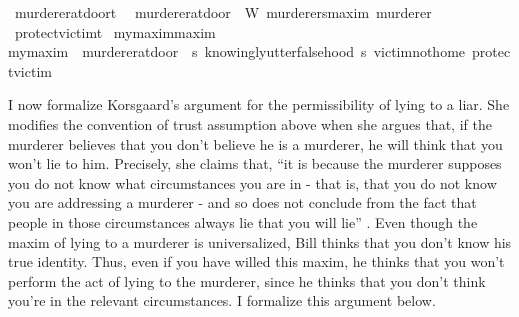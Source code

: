 \begin{isabellebody}
%
\isanewline
{}\isamarkupfalse%
\ murderer{\isacharunderscore}at{\isacharunderscore}door{\isacharcolon}{\isacharcolon}t\ \ \isanewline
{\isachardoublequoteopen}murderer{\isacharunderscore}at{\isacharunderscore}door\ {\isasymequiv}\ W\ murderers{\isacharunderscore}maxim\ murderer{\isachardoublequoteclose}\isanewline
%
\isanewline
{}\isamarkupfalse%
\ protect{\isacharunderscore}victim{\isacharcolon}{\isacharcolon}t\isanewline
%
\isanewline
{}\isamarkupfalse%
\ my{\isacharunderscore}maxim{\isacharcolon}{\isacharcolon}maxim\ \ \isanewline
{\isachardoublequoteopen}my{\isacharunderscore}maxim\ {\isasymequiv}\ {\isacharparenleft}murderer{\isacharunderscore}at{\isacharunderscore}door{\isacharcomma}\ \ {\isasymlambda}s{\isachardot}\ knowingly{\isacharunderscore}utter{\isacharunderscore}falsehood\ s\ victim{\isacharunderscore}not{\isacharunderscore}home{\isacharcomma}\ protect{\isacharunderscore}victim{\isacharparenright}{\isachardoublequoteclose}\isanewline
%
%
\isadelimproof
%
\endisadelimproof
%
\isatagproof
%
\endisatagproof
{\isafoldproof}%
%
\isadelimproof
%
\endisadelimproof
%
\begin{isamarkuptext}%
I now formalize Korsgaard's argument for the permissibility of lying to a liar. She modifies
the convention of trust assumption above when she argues that, if the murderer believes that you don't 
believe he is a murderer, he will think that you won't lie to him. Precisely, she claims that, 
``it is because the murderer supposes you do not know what circumstances you are in - that is, that 
you do not know you are addressing a murderer - and so does not conclude from the fact that people 
in those circumstances always lie that you will lie'' \cite[6]{KorsgaardRTL}. Even though the maxim of 
lying to a murderer is universalized, Bill thinks that you don't know his true identity. Thus,
even if you have willed this maxim, he thinks that you won't perform the act of lying to the murderer,
since he thinks that you don't think you're in the relevant circumstances. I formalize this argument below.%

\end{isamarkuptext}
\end{isabellebody}
